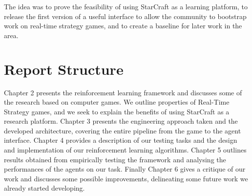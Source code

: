 The idea was to prove the feasibility of using StarCraft as a learning platform,
to release the first version of a useful interface to allow the community to
bootstrap work on real-time strategy games, and to create a baseline for later
work in the area.

\section{Report Structure}

Chapter 2 presents the reinforcement learning framework and discusses some of
the research based on computer games. We outline properties of Real-Time
Strategy games, and we seek to explain the benefits of using StarCraft as a
research platform. Chapter 3 presents the engineering approach taken and the
developed architecture, covering the entire pipeline from the game to the agent
interface. Chapter 4 provides a description of our testing tasks and the design
and implementation of our reinforcement learning algorithms. Chapter 5 outlines
results obtained from empirically testing the framework and analysing the
performances of the agents on our task. Finally Chapter 6 gives a critique of
our work and discusses some possible improvements, delineating some future work
we already started developing.

